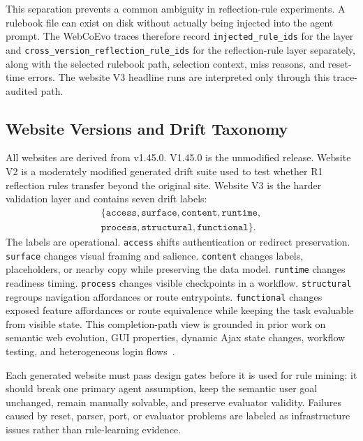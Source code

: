 This separation prevents a common ambiguity in reflection-rule experiments. A rulebook file can exist on disk without actually being injected into the agent prompt. The WebCoEvo traces therefore record \texttt{injected\_rule\_ids} for the \expel{} layer and \texttt{cross\_version\_reflection\_rule\_ids} for the reflection-rule layer separately, along with the selected rulebook path, selection context, miss reasons, and reset-time errors. The website V3 headline runs are interpreted only through this trace-audited path.

\subsection{Website Versions and Drift Taxonomy}

All websites are derived from \linkding{} v1.45.0. \linkding{} V1.45.0 is the unmodified release. Website V2 is a moderately modified generated drift suite used to test whether R1 reflection rules transfer beyond the original site. Website V3 is the harder validation layer and contains seven drift labels:
\[
\begin{gathered}
\{\texttt{access},\texttt{surface},\texttt{content},\texttt{runtime},\\
\texttt{process},\texttt{structural},\texttt{functional}\}.
\end{gathered}
\]
The labels are operational. \texttt{access} shifts authentication or redirect preservation. \texttt{surface} changes visual framing and salience. \texttt{content} changes labels, placeholders, or nearby copy while preserving the data model. \texttt{runtime} changes readiness timing. \texttt{process} changes visible checkpoints in a workflow. \texttt{structural} regroups navigation affordances or route entrypoints. \texttt{functional} changes exposed feature affordances or route equivalence while keeping the task evaluable from visible state. This completion-path view is grounded in prior work on semantic web evolution, GUI properties, dynamic Ajax state changes, workflow testing, and heterogeneous login flows~\citep{shao2021webevo,macchi2021imagebased,mesbah2012crawling,sanchez2011workflow,jonker2018shepherd}.

Each generated website must pass design gates before it is used for rule mining: it should break one primary agent assumption, keep the semantic user goal unchanged, remain manually solvable, and preserve evaluator validity. Failures caused by reset, parser, port, or evaluator problems are labeled as infrastructure issues rather than rule-learning evidence.


